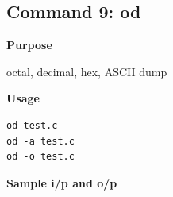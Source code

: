 \documentclass{article}
\begin{document}
\subsection{Command 9: od} 
\textbf{Purpose}
\begin{flushleft}
 octal, decimal, hex, ASCII dump
\end{flushleft}
\textbf{Usage}
\begin{verbatim}
od test.c
od -a test.c
od -o test.c
\end{verbatim}
\textbf{Sample i/p and o/p}
\begin{figure}[H] 
\end{figure}
\end{document}
